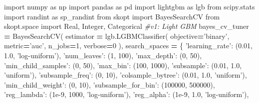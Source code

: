 \documentclass[]{book}
\newenvironment{Shaded}{\begin{snugshade}}{\end{snugshade}}
\newcommand{\DecValTok}[1]{\textcolor[rgb]{0.00,0.00,0.81}{#1}}
\newcommand{\FloatTok}[1]{\textcolor[rgb]{0.00,0.00,0.81}{#1}}
\newcommand{\StringTok}[1]{\textcolor[rgb]{0.31,0.60,0.02}{#1}}
\newcommand{\ImportTok}[1]{#1}
\newcommand{\CommentTok}[1]{\textcolor[rgb]{0.56,0.35,0.01}{\textit{#1}}}
\newcommand{\OperatorTok}[1]{\textcolor[rgb]{0.81,0.36,0.00}{\textbf{#1}}}
\newcommand{\NormalTok}[1]{#1}
\begin{document}
\begin{Shaded}
\begin{Highlighting}[]
\ImportTok{import}\NormalTok{ numpy }\ImportTok{as}\NormalTok{ np}
\ImportTok{import}\NormalTok{ pandas }\ImportTok{as}\NormalTok{ pd}
\ImportTok{import}\NormalTok{ lightgbm }\ImportTok{as}\NormalTok{ lgb}
\ImportTok{from}\NormalTok{ scipy.stats }\ImportTok{import}\NormalTok{ randint }\ImportTok{as}\NormalTok{ sp_randint}
\ImportTok{from}\NormalTok{ skopt }\ImportTok{import}\NormalTok{ BayesSearchCV}
\ImportTok{from}\NormalTok{ skopt.space }\ImportTok{import}\NormalTok{ Real, Integer, Categorical}
\CommentTok{#v1: Light GBM}
\NormalTok{bayes_cv_tuner }\OperatorTok{=}\NormalTok{ BayesSearchCV(}
\NormalTok{    estimator }\OperatorTok{=}\NormalTok{ lgb.LGBMClassifier(}
\NormalTok{        objective}\OperatorTok{=}\StringTok{'binary'}\NormalTok{,}
\NormalTok{        metric}\OperatorTok{=}\StringTok{'auc'}\NormalTok{,}
\NormalTok{        n_jobs}\OperatorTok{=}\DecValTok{1}\NormalTok{,}
\NormalTok{        verbose}\OperatorTok{=}\DecValTok{0}
\NormalTok{    ),}
\NormalTok{    search_spaces }\OperatorTok{=}\NormalTok{ \{}
        \StringTok{'learning_rate'}\NormalTok{: (}\FloatTok{0.01}\NormalTok{, }\FloatTok{1.0}\NormalTok{, }\StringTok{'log-uniform'}\NormalTok{),}
        \StringTok{'num_leaves'}\NormalTok{: (}\DecValTok{1}\NormalTok{, }\DecValTok{100}\NormalTok{),      }
        \StringTok{'max_depth'}\NormalTok{: (}\DecValTok{0}\NormalTok{, }\DecValTok{50}\NormalTok{),}
        \StringTok{'min_child_samples'}\NormalTok{: (}\DecValTok{0}\NormalTok{, }\DecValTok{50}\NormalTok{),}
        \StringTok{'max_bin'}\NormalTok{: (}\DecValTok{100}\NormalTok{, }\DecValTok{1000}\NormalTok{),}
        \StringTok{'subsample'}\NormalTok{: (}\FloatTok{0.01}\NormalTok{, }\FloatTok{1.0}\NormalTok{, }\StringTok{'uniform'}\NormalTok{),}
        \StringTok{'subsample_freq'}\NormalTok{: (}\DecValTok{0}\NormalTok{, }\DecValTok{10}\NormalTok{),}
        \StringTok{'colsample_bytree'}\NormalTok{: (}\FloatTok{0.01}\NormalTok{, }\FloatTok{1.0}\NormalTok{, }\StringTok{'uniform'}\NormalTok{),}
        \StringTok{'min_child_weight'}\NormalTok{: (}\DecValTok{0}\NormalTok{, }\DecValTok{10}\NormalTok{),}
        \StringTok{'subsample_for_bin'}\NormalTok{: (}\DecValTok{100000}\NormalTok{, }\DecValTok{500000}\NormalTok{),}
        \StringTok{'reg_lambda'}\NormalTok{: (}\FloatTok{1e-9}\NormalTok{, }\DecValTok{1000}\NormalTok{, }\StringTok{'log-uniform'}\NormalTok{),}
        \StringTok{'reg_alpha'}\NormalTok{: (}\FloatTok{1e-9}\NormalTok{, }\FloatTok{1.0}\NormalTok{, }\StringTok{'log-uniform'}\NormalTok{),}

\end{Highlighting}
\end{Shaded}
\end{document}
